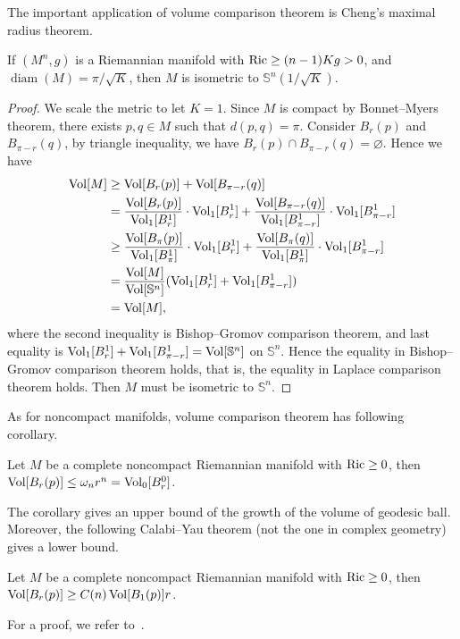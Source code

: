 The important application of volume comparison theorem is Cheng's maximal radius theorem.
\begin{thm}[Cheng]
    If $(M^n,g)$ is a Riemannian manifold with $\operatorname{Ric}\geq(n-1)Kg>0$, and $\operatorname{diam}(M)=\pi/\sqrt{K}$, then $M$ is isometric to $\mathbb{S}^n(1/\sqrt{K})$.
\end{thm}
\begin{proof}
    We scale the metric to let $K=1$.
    Since $M$ is compact by Bonnet--Myers theorem, there exists $p,q\in M$ such that $d(p,q)=\pi$.
    Consider $B_r(p)$ and $B_{\pi-r}(q)$, by triangle inequality, we have $B_r(p)\cap B_{\pi-r}(q)=\varnothing$.
    Hence we have
    \begin{align*}
        \operatorname{Vol}[M]&\geq\operatorname{Vol}[B_r(p)]+\operatorname{Vol}[B_{\pi-r}(q)]\\
        &=\frac{\operatorname{Vol}[B_r(p)]}{\operatorname{Vol}_1[B_r^1]}\cdot\operatorname{Vol}_1[B_r^1]+\frac{\operatorname{Vol}[B_{\pi-r}(q)]}{\operatorname{Vol}_1[B_{\pi-r}^1]}\cdot\operatorname{Vol}_1[B_{\pi-r}^1]\\
        &\geq\frac{\operatorname{Vol}[B_\pi(p)]}{\operatorname{Vol}_1[B_\pi^1]}\cdot\operatorname{Vol}_1[B_r^1]+\frac{\operatorname{Vol}[B_\pi(q)]}{\operatorname{Vol}_1[B_\pi^1]}\cdot\operatorname{Vol}_1[B_{\pi-r}^1]\\
        &=\frac{\operatorname{Vol}[M]}{\operatorname{Vol}[\mathbb{S}^n]}(\operatorname{Vol}_1[B_r^1]+\operatorname{Vol}_1[B_{\pi-r}^1])\\
        &=\operatorname{Vol}[M],
    \end{align*}
    where the second inequality is Bishop--Gromov comparison theorem, and last equality is $\operatorname{Vol}_1[B_r^1]+\operatorname{Vol}_1[B_{\pi-r}^1]=\operatorname{Vol}[\mathbb{S}^n]$ on $\mathbb{S}^n$.
    Hence the equality in Bishop--Gromov comparison theorem holds, that is, the equality in Laplace comparison theorem holds.
    Then $M$ must be isometric to $\mathbb{S}^n$.
\end{proof}

As for noncompact manifolds, volume comparison theorem has following corollary.

\begin{cor}
    Let $M$ be a complete noncompact Riemannian manifold with $\operatorname{Ric}\geq 0$, then $\operatorname{Vol}[B_r(p)]\leq\omega_nr^n=\operatorname{Vol}_0[B_r^0]$.
\end{cor}

The corollary gives an upper bound of the growth of the volume of geodesic ball.
Moreover, the following Calabi--Yau theorem (not the one in complex geometry) gives a lower bound.
\begin{thm}
    Let $M$ be a complete noncompact Riemannian manifold with $\operatorname{Ric}\geq 0$, then $\operatorname{Vol}[B_r(p)]\geq C(n)\operatorname{Vol}[B_1(p)]r$.
\end{thm}
For a proof, we refer to~\cite[Chapter~1.~Theorem~4.1]{Shoen-Yau}.